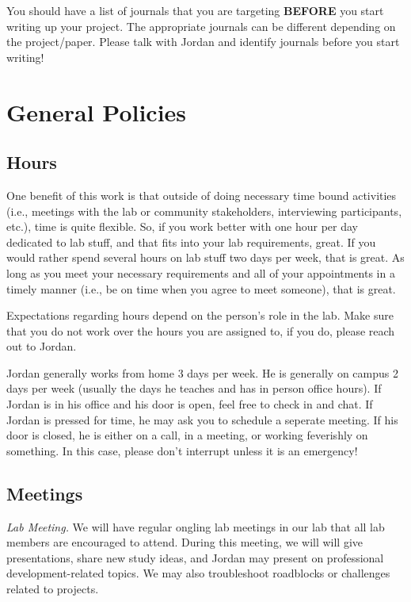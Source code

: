 \documentclass[
]{book}
\begin{document}
You should have a list of journals that you are targeting \textbf{BEFORE} you start writing up your project. The appropriate journals can be different depending on the project/paper. Please talk with Jordan and identify journals before you start writing!

\hypertarget{general-policies}{%
\section{General Policies}\label{general-policies}}

\hypertarget{hours}{%
\subsection{Hours}\label{hours}}

One benefit of this work is that outside of doing necessary time bound activities (i.e., meetings with the lab or community stakeholders, interviewing participants, etc.), time is quite flexible. So, if you work better with one hour per day dedicated to lab stuff, and that fits into your lab requirements, great. If you would rather spend several hours on lab stuff two days per week, that is great. As long as you meet your necessary requirements and all of your appointments in a timely manner (i.e., be on time when you agree to meet someone), that is great.

Expectations regarding hours depend on the person's role in the lab. Make sure that you do not work over the hours you are assigned to, if you do, please reach out to Jordan.

Jordan generally works from home 3 days per week. He is generally on campus 2 days per week (usually the days he teaches and has in person office hours). If Jordan is in his office and his door is open, feel free to check in and chat. If Jordan is pressed for time, he may ask you to schedule a seperate meeting. If his door is closed, he is either on a call, in a meeting, or working feverishly on something. In this case, please don't interrupt unless it is an emergency!

\hypertarget{meetings}{%
\subsection{Meetings}\label{meetings}}

\emph{Lab Meeting.} We will have regular ongling lab meetings in our lab that all lab members are encouraged to attend. During this meeting, we will will give presentations, share new study ideas, and Jordan may present on professional development-related topics. We may also troubleshoot roadblocks or challenges related to projects.
\end{document}
